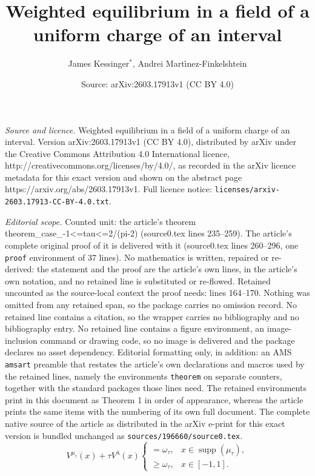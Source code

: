 \documentclass[10pt,a4paper]{amsart}
\title{Weighted equilibrium in a field of a uniform charge of an interval}
\author{James Kessinger$^*$, Andrei Mart\'{\i}nez-Finkelshtein}
\date{Source: arXiv:2603.17913v1 (CC BY 4.0)}
\DeclareMathOperator{\supp}{supp}
\begin{document}
\maketitle

\noindent\emph{Source and licence.} Weighted equilibrium in a field of a uniform charge of an interval. Version arXiv:2603.17913v1 (CC BY 4.0), distributed by arXiv under the Creative Commons Attribution 4.0 International licence, http://creativecommons.org/licenses/by/4.0/, as recorded in the arXiv licence metadata for this exact version and shown on the abstract page https://arxiv.org/abs/2603.17913v1. Full licence notice: \texttt{licenses/arxiv-2603.17913-CC-BY-4.0.txt}.\par\smallskip

\noindent\textit{Editorial scope.} Counted unit: the article's theorem theorem\_case\_-1<=tau<=2/(pi-2) (source0.tex lines 235--259). The article's complete original proof of it is delivered with it (source0.tex lines 260--296, one \texttt{proof} environment of 37 lines). No mathematics is written, repaired or re-derived: the statement and the proof are the article's own lines, in the article's own notation, and no retained line is substituted or re-flowed.  Retained uncounted as the source-local context the proof needs: lines 164--170.  Nothing was omitted from any retained span, so the package carries no omission record.  No retained line contains a citation, so the wrapper carries no bibliography and no bibliography entry.  No retained line contains a figure environment, an image-inclusion command or drawing code, so no image is delivered and the package declares no asset dependency.  Editorial formatting only, in addition: an AMS \texttt{amsart} preamble that restates the article's own declarations and macros used by the retained lines, namely the environments \texttt{theorem} on separate counters, together with the standard packages those lines need.  The retained environments print in this document as Theorem 1 in order of appearance, whereas the article prints the same items with the numbering of its own full document.  The complete native source of the article as distributed in the arXiv e-print for this exact version is bundled unchanged as \texttt{sources/196660/source0.tex}.
\begin{equation}
    \label{equilibrium}
   V^{\mu_\tau}(x)  +\tau V^{\lambda}(x) \begin{cases}
       = \omega_\tau, & x\in \supp (\mu_\tau), \\
    \ge \omega_\tau, & x\in [-1,1].
   \end{cases}
\end{equation}
\end{document}
